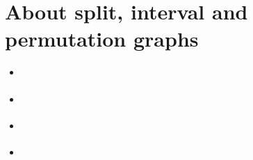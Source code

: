 \documentclass[a4paper,12pt,english]{sphinxhowto}
\begin{document}
\section{About split, interval and permutation graphs}
\label{\detokenize{tutorial:about-split-interval-and-permutation-graphs}}\label{\detokenize{tutorial:permutation-tutorial-label}}
\begin{sphinxShadowBox}
\begin{itemize}
\item {} 
\label{\detokenize{tutorial:id229}}{\hyperref[\detokenize{tutorial:a-multiply-perfect-graph}]{}}

\item {} 
\label{\detokenize{tutorial:id230}}{\hyperref[\detokenize{tutorial:who-is-the-liar}]{}}

\item {} 
\label{\detokenize{tutorial:id231}}{\hyperref[\detokenize{tutorial:generating-permutation-graphs}]{}}

\item {} 
\label{\detokenize{tutorial:id232}}{\hyperref[\detokenize{tutorial:recognizing-permutation-graphs}]{}}

\end{itemize}
\end{sphinxShadowBox}
\end{document}
